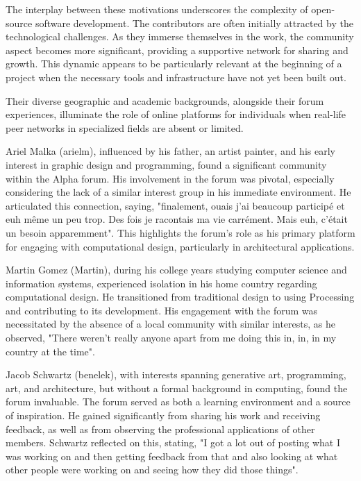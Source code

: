 The interplay between these motivations underscores the complexity of open-source software development. The contributors are often initially attracted by the technological challenges. As they immerse themselves in the work, the community aspect becomes more significant, providing a supportive network for sharing and growth. This dynamic appears to be particularly relevant at the beginning of a project when the necessary tools and infrastructure have not yet been built out.




Their diverse geographic and academic backgrounds, alongside their forum experiences, illuminate the role of online platforms for individuals when real-life peer networks in specialized fields are absent or limited.

Ariel Malka (arielm), influenced by his father, an artist painter, and his early interest in graphic design and programming, found a significant community within the Alpha forum. His involvement in the forum was pivotal, especially considering the lack of a similar interest group in his immediate environment. He articulated this connection, saying, "finalement, ouais j'ai beaucoup participé et euh même un peu trop. Des fois je racontais ma vie carrément. Mais euh, c'était un besoin apparemment"​​. This highlights the forum's role as his primary platform for engaging with computational design, particularly in architectural applications.

Martin Gomez (Martin), during his college years studying computer science and information systems, experienced isolation in his home country regarding computational design. He transitioned from traditional design to using Processing and contributing to its development. His engagement with the forum was necessitated by the absence of a local community with similar interests, as he observed, "There weren't really anyone apart from me doing this in, in, in my country at the time"​​.

Jacob Schwartz (benelek), with interests spanning generative art, programming, art, and architecture, but without a formal background in computing, found the forum invaluable. The forum served as both a learning environment and a source of inspiration. He gained significantly from sharing his work and receiving feedback, as well as from observing the professional applications of other members. Schwartz reflected on this, stating, "I got a lot out of posting what I was working on and then getting feedback from that and also looking at what other people were working on and seeing how they did those things"​​.

